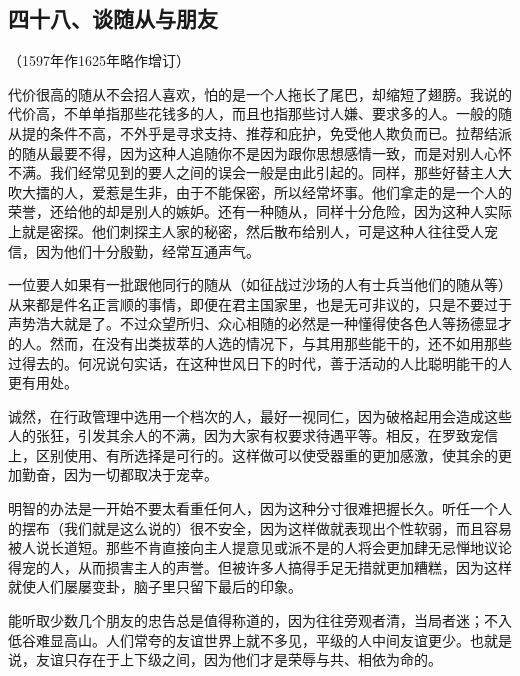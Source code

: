 \subsection*{四十八、谈随从与朋友}
\begin{center}
    （1597年作1625年略作增订）
\end{center}
\par 代价很高的随从不会招人喜欢，怕的是一个人拖长了尾巴，却缩短了翅膀。我说的代价高，不单单指那些花钱多的人，而且也指那些讨人嫌、要求多的人。一般的随从提的条件不高，不外乎是寻求支持、推荐和庇护，免受他人欺负而已。拉帮结派的随从最要不得，因为这种人追随你不是因为跟你思想感情一致，而是对别人心怀不满。我们经常见到的要人之间的误会一般是由此引起的。同样，那些好替主人大吹大擂的人，爱惹是生非，由于不能保密，所以经常坏事。他们拿走的是一个人的荣誉，还给他的却是别人的嫉妒。还有一种随从，同样十分危险，因为这种人实际上就是密探。他们刺探主人家的秘密，然后散布给别人，可是这种人往往受人宠信，因为他们十分殷勤，经常互通声气。
\par 一位要人如果有一批跟他同行的随从（如征战过沙场的人有士兵当他们的随从等）从来都是件名正言顺的事情，即便在君主国家里，也是无可非议的，只是不要过于声势浩大就是了。不过众望所归、众心相随的必然是一种懂得使各色人等扬德显才的人。然而，在没有出类拔萃的人选的情况下，与其用那些能干的，还不如用那些过得去的。何况说句实话，在这种世风日下的时代，善于活动的人比聪明能干的人更有用处。
\par 诚然，在行政管理中选用一个档次的人，最好一视同仁，因为破格起用会造成这些人的张狂，引发其余人的不满，因为大家有权要求待遇平等。相反，在罗致宠信上，区别使用、有所选择是可行的。这样做可以使受器重的更加感激，使其余的更加勤奋，因为一切都取决于宠幸。
\par 明智的办法是一开始不要太看重任何人，因为这种分寸很难把握长久。听任一个人的摆布（我们就是这么说的）很不安全，因为这样做就表现出个性软弱，而且容易被人说长道短。那些不肯直接向主人提意见或派不是的人将会更加肆无忌惮地议论得宠的人，从而损害主人的声誉。但被许多人搞得手足无措就更加糟糕，因为这样就使人们屡屡变卦，脑子里只留下最后的印象。
\par 能听取少数几个朋友的忠告总是值得称道的，因为往往旁观者清，当局者迷；不入低谷难显高山。人们常夸的友谊世界上就不多见，平级的人中间友谊更少。也就是说，友谊只存在于上下级之间，因为他们才是荣辱与共、相依为命的。




